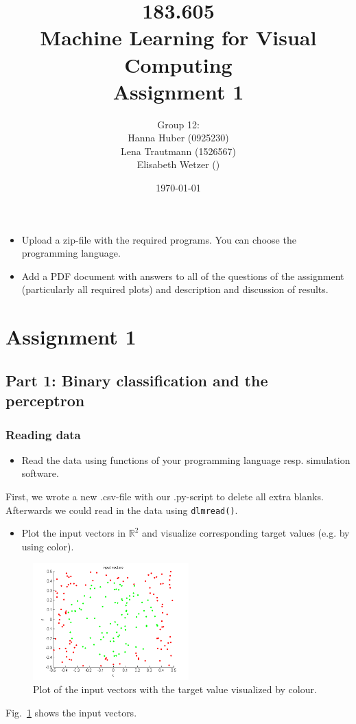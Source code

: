 \documentclass[a4]{article}
\title{\bf 183.605 \\ Machine Learning for Visual Computing \\ Assignment 1}
\author{Group 12: \\
	Hanna Huber (0925230) \\ Lena Trautmann (1526567) \\ Elisabeth Wetzer ()}
\date{\today}
\begin{document}
\maketitle
\noindent

\begin{itemize}
\item Upload a zip-file with the required programs. You can choose the programming language.
\item Add a PDF document with answers to all of the questions of the assignment (particularly all required plots) and description and discussion of results. 
\end{itemize}

\section{Assignment 1}
\subsection{Part 1: Binary classification and the perceptron}

\subsubsection{Reading data}\label{sec:readdata}
\begin{itemize}
\item Read the data using functions of your programming language resp. simulation software.
\end{itemize}
First, we wrote a new .csv-file with our .py-script to delete all extra blanks. Afterwards we could read in the data using \texttt{dlmread()}.

\begin{itemize}
\item Plot the input vectors in $\mathbb{R}^2$ and visualize corresponding target values (e.g. by using color). 
\end{itemize}
\begin{figure}[!h]
	\begin{center}
		\centering
		\includegraphics[width=6cm]{../figures/inputVectors.pdf}
	\end{center}	
	\caption{Plot of the input vectors with the target value visualized by colour.}
	\label{fig:inputVectors}
\end{figure}
Fig.~\ref{fig:inputVectors} shows the input vectors.
\end{document}
